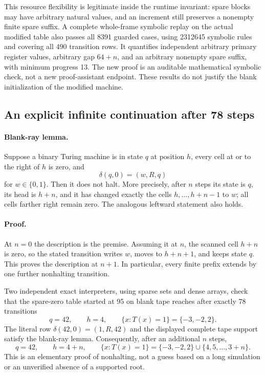 This resource flexibility is legitimate inside the runtime invariant:
spare blocks may have arbitrary natural values, and an increment still
preserves a nonempty finite spare suffix. A complete whole-frame symbolic
replay on the actual modified table also passes all 8391 guarded cases,
using 2312645 symbolic rules and covering all 490 transition rows. It
quantifies independent arbitrary primary register values, arbitrary gap
$64+n$, and an arbitrary nonempty spare suffix, with minimum progress 13.
The new proof is an auditable mathematical symbolic check, not a new
proof-assistant endpoint. These results do not justify the blank
initialization of the modified machine.

\subsection{An explicit infinite continuation after 78 steps}

\paragraph{Blank-ray lemma.}
Suppose a binary Turing machine is in state $q$ at position $h$, every cell
at or to the right of $h$ is zero, and
\[
 \delta(q,0)=(w,R,q)
\]
for $w\in\{0,1\}$. Then it does not halt. More precisely, after $n$ steps
its state is $q$, its head is $h+n$, and it has changed exactly the cells
$h,\ldots,h+n-1$ to $w$; all cells farther right remain zero. The analogous
leftward statement also holds.

\paragraph{Proof.}
At $n=0$ the description is the premise. Assuming it at $n$, the scanned
cell $h+n$ is zero, so the stated transition writes $w$, moves to $h+n+1$,
and keeps state $q$. This proves the description at $n+1$. In particular,
every finite prefix extends by one further nonhalting transition.

Two independent exact interpreters, using sparse sets and dense arrays,
check that the spare-zero table started at 95 on blank tape reaches after
exactly 78 transitions
\[
 q=42,\qquad h=4,\qquad
 \{x:T(x)=1\}=\{-3,-2,2\}.
\]
The literal row $\delta(42,0)=(1,R,42)$ and the displayed complete tape
support satisfy the blank-ray lemma. Consequently, after an additional
$n$ steps,
\[
 q=42,\qquad h=4+n,\qquad
 \{x:T(x)=1\}=\{-3,-2,2\}\cup\{4,5,\ldots,3+n\}.
\]
This is an elementary proof of nonhalting, not a guess based on a long
simulation or an unverified absence of a supported root.

